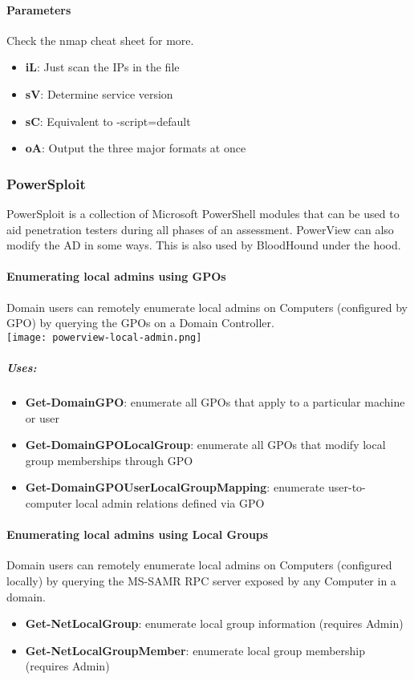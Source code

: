 \paragraph{Parameters}
Check the nmap cheat sheet for more.
\begin{itemize}
  \item \textbf{iL}: Just scan the IPs in the file
  \item \textbf{sV}: Determine service version
  \item \textbf{sC}: Equivalent to -script=default
  \item \textbf{oA}: Output the three major formats at once
\end{itemize}


\subsubsection{PowerSploit}
PowerSploit is a collection of Microsoft PowerShell modules that can be used to aid penetration testers during all phases of an assessment.
PowerView can also modify the AD in some ways.
This is also used by BloodHound under the hood.

\paragraph{Enumerating local admins using GPOs}
Domain users can remotely enumerate local admins on Computers (configured by GPO) by querying the GPOs on a Domain Controller.\\
\texttt{[image: powerview-local-admin.png]}
\subparagraph{Uses:}
\begin{itemize}
  \item \textbf{Get-DomainGPO}: enumerate all GPOs that apply to a particular machine or user
  \item \textbf{Get-DomainGPOLocalGroup}: enumerate all GPOs that modify local group memberships through GPO
  \item \textbf{Get-DomainGPOUserLocalGroupMapping}: enumerate user-to-computer local admin relations defined via GPO
\end{itemize}

\paragraph{Enumerating local admins using Local Groups}
Domain users can remotely enumerate local admins on Computers (configured locally) by querying the MS-SAMR RPC server exposed by any Computer in a domain.
\begin{itemize}
  \item \textbf{Get-NetLocalGroup}: enumerate local group information (requires Admin)
  \item \textbf{Get-NetLocalGroupMember}: enumerate local group membership (requires Admin)
\end{itemize}

